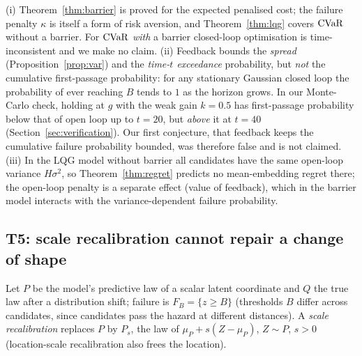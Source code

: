 \begin{remark}\label{rem:firstpassage}
(i) Theorem~\ref{thm:barrier} is proved for the expected penalised cost; the failure penalty $\kappa$ is itself a form of risk aversion, and Theorem~\ref{thm:lqg} covers $\operatorname{CVaR}$ without a barrier. For $\operatorname{CVaR}$ \emph{with} a barrier closed-loop optimisation is time-inconsistent and we make no claim.
(ii) Feedback bounds the \emph{spread} (Proposition~\ref{prop:var}) and the \emph{time-$t$ exceedance} probability, but \emph{not} the cumulative first-passage probability: for any stationary Gaussian closed loop the probability of ever reaching $B$ tends to $1$ as the horizon grows. In our Monte-Carlo check, holding at $g$ with the weak gain $k=0.5$ has first-passage probability below that of open loop up to $t=20$, but \emph{above} it at $t=40$ (Section~\ref{sec:verification}). Our first conjecture, that feedback keeps the cumulative failure probability bounded, was therefore false and is not claimed.
(iii) In the LQG model without barrier all candidates have the same open-loop variance $H\sigma^2$, so Theorem~\ref{thm:regret} predicts no mean-embedding regret there; the open-loop penalty is a separate effect (value of feedback), which in the barrier model interacts with the variance-dependent failure probability.
\end{remark}

\subsection{T5: scale recalibration cannot repair a change of shape}\label{sec:t5}

Let $P$ be the model's predictive law of a scalar latent coordinate and $Q$ the true law after a distribution shift; failure is $F_B=\{z\ge B\}$ (thresholds $B$ differ across candidates, since candidates pass the hazard at different distances).
A \emph{scale recalibration} replaces $P$ by $P_s$, the law of $\mu_P+s(Z-\mu_P)$, $Z\sim P$, $s>0$ (location-scale recalibration also frees the location).

